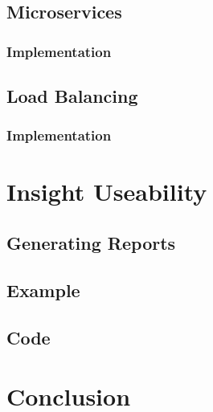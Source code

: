\documentclass{article}
\begin{document}
\subsection{Microservices}
\subsubsection{Implementation}

\subsection{Load Balancing}
\subsubsection{Implementation}

\section{Insight Useability}
\subsection{Generating Reports}
\subsection{Example}
\subsection{Code}

\section{Conclusion}
\end{document}
